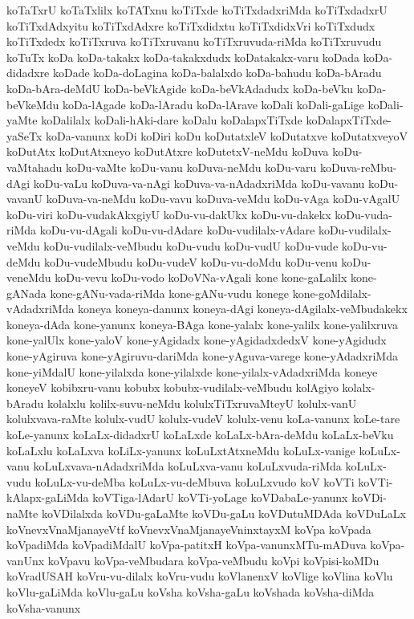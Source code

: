 {koTaTxrU
koTaTxlilx
koTATxnu
koTiTxde
koTiTxdadxriMda
koTiTxdadxrU
koTiTxdAdxyitu
koTiTxdAdxre
koTiTxdidxtu
koTiTxdidxVri
koTiTxdudx
koTiTxdedx
koTiTxruva
koTiTxruvanu
koTiTxruvuda-riMda
koTiTxruvudu
koTuTx
koDa
koDa-takakx
koDa-takakxdudx
koDatakakx-varu
koDada
koDa-didadxre
koDade
koDa-doLagina
koDa-balalxdo
koDa-bahudu
koDa-bAradu
koDa-bAra-deMdU
koDa-beVkAgide
koDa-beVkAdadudx
koDa-beVku
koDa-beVkeMdu
koDa-lAgade
koDa-lAradu
koDa-lArave
koDali
koDali-gaLige
koDali-yaMte
koDalilalx
koDali-hAki-dare
koDalu
koDalapxTiTxde
koDalapxTiTxde-yaSeTx
koDa-vanunx
koDi
koDiri
koDu
koDutatxleV
koDutatxve
koDutatxveyoV
koDutAtx
koDutAtxneyo
koDutAtxre
koDutetxV-neMdu
koDuva
koDu-vaMtahadu
koDu-vaMte
koDu-vanu
koDuva-neMdu
koDu-varu
koDuva-reMbu-dAgi
koDu-vaLu
koDuva-va-nAgi
koDuva-va-nAdadxriMda
koDu-vavanu
koDu-vavanU
koDuva-va-neMdu
koDu-vavu
koDuva-veMdu
koDu-vAga
koDu-vAgalU
koDu-viri
koDu-vudakAkxgiyU
koDu-vu-dakUkx
koDu-vu-dakekx
koDu-vuda-riMda
koDu-vu-dAgali
koDu-vu-dAdare
koDu-vudilalx-vAdare
koDu-vudilalx-veMdu
koDu-vudilalx-veMbudu
koDu-vudu
koDu-vudU
koDu-vude
koDu-vu-deMdu
koDu-vudeMbudu
koDu-vudeV
koDu-vu-doMdu
koDu-venu
koDu-veneMdu
koDu-vevu
koDu-vodo
koDoVNa-vAgali
kone
kone-gaLalilx
kone-gANada
kone-gANu-vada-riMda
kone-gANu-vudu
konege
kone-goMdilalx-vAdadxriMda
koneya
koneya-danunx
koneya-dAgi
koneya-dAgilalx-veMbudakekx
koneya-dAda
kone-yanunx
koneya-BAga
kone-yalalx
kone-yalilx
kone-yalilxruva
kone-yalUlx
kone-yaloV
kone-yAgidadx
kone-yAgidadxdedxV
kone-yAgidudx
kone-yAgiruva
kone-yAgiruvu-dariMda
kone-yAguva-varege
kone-yAdadxriMda
kone-yiMdalU
kone-yilalxda
kone-yilalxde
kone-yilalx-vAdadxriMda
koneye
koneyeV
kobibxru-vanu
kobubx
kobubx-vudilalx-veMbudu
kolAgiyo
kolalx-bAradu
kolalxlu
kolilx-suvu-neMdu
kolulxTiTxruvaMteyU
kolulx-vanU
kolulxvava-raMte
kolulx-vudU
kolulx-vudeV
kolulx-venu
koLa-vanunx
koLe-tare
koLe-yanunx
koLaLx-didadxrU
koLaLxde
koLaLx-bAra-deMdu
koLaLx-beVku
koLaLxlu
koLaLxva
koLiLx-yanunx
koLuLxtAtxneMdu
koLuLx-vanige
koLuLx-vanu
koLuLxvava-nAdadxriMda
koLuLxva-vanu
koLuLxvuda-riMda
koLuLx-vudu
koLuLx-vu-deMba
koLuLx-vu-deMbuva
koLuLxvudo
koV
koVTi
koVTi-kAlapx-gaLiMda
koVTiga-lAdarU
koVTi-yoLage
koVDabaLe-yanunx
koVDi-naMte
koVDilalxda
koVDu-gaLaMte
koVDu-gaLu
koVDutuMDAda
koVDuLaLx
koVnevxVnaMjanayeVtf
koVnevxVnaMjanayeVninxtayxM
koVpa
koVpada
koVpadiMda
koVpadiMdalU
koVpa-patitxH
koVpa-vanunxMTu-mADuva
koVpa-vanUnx
koVpavu
koVpa-veMbudara
koVpa-veMbudu
koVpi
koVpisi-koMDu
koVradUSAH
koVru-vu-dilalx
koVru-vudu
koVlanenxV
koVlige
koVlina
koVlu
koVlu-gaLiMda
koVlu-gaLu
koVsha
koVsha-gaLu
koVshada
koVsha-diMda
koVsha-vanunx
}
